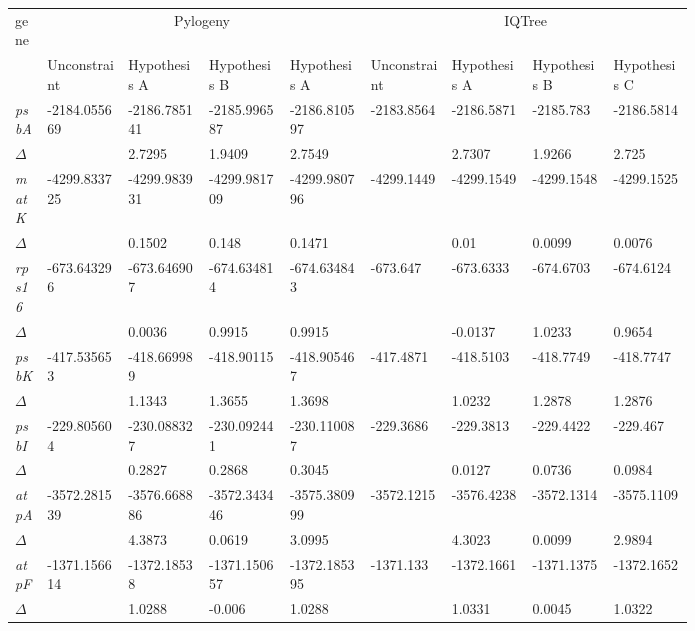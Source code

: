 \documentclass[a4paper]{article}
\begin{document}
\footnotesize
\begin{longtable}{p{0.03\linewidth}|p{0.095\linewidth}p{0.095\linewidth}p{0.095\linewidth}p{0.095\linewidth}|p{0.095\linewidth}p{0.095\linewidth}p{0.095\linewidth}p{0.095\linewidth}}
gene & \multicolumn{4}{c}{Pylogeny} & \multicolumn{4}{c}{IQTree}\\
 & Unconstraint & Hypothesis A & Hypothesis B & Hypothesis A & Unconstraint & Hypothesis A & Hypothesis B & Hypothesis C\\
\endhead
 \rowcolor{black!20} \textit{psbA} & -2184.055669 & -2186.785141 & -2185.996587 & -2186.810597 & -2183.8564 & -2186.5871 & -2185.783 & -2186.5814\\
 \rowcolor{black!20} $\Delta$ &  & 2.7295 & 1.9409 & 2.7549 &  & 2.7307 & 1.9266 & 2.725\\
\textit{matK} & -4299.833725 & -4299.983931 & -4299.981709 & -4299.980796 & -4299.1449 & -4299.1549 & -4299.1548 & -4299.1525\\
$\Delta$ &  & 0.1502 & 0.148 & 0.1471 &  & 0.01 & 0.0099 & 0.0076\\
 \rowcolor{black!20} \textit{rps16} & -673.643296 & -673.646907 & -674.634814 & -674.634843 & -673.647 & -673.6333 & -674.6703 & -674.6124\\
 \rowcolor{black!20} $\Delta$ &  & 0.0036 & 0.9915 & 0.9915 &  & -0.0137 & 1.0233 & 0.9654\\
\textit{psbK} & -417.535653 & -418.669989 & -418.90115 & -418.905467 & -417.4871 & -418.5103 & -418.7749 & -418.7747\\
$\Delta$ &  & 1.1343 & 1.3655 & 1.3698 &  & 1.0232 & 1.2878 & 1.2876\\
 \rowcolor{black!20} \textit{psbI} & -229.805604 & -230.088327 & -230.092441 & -230.110087 & -229.3686 & -229.3813 & -229.4422 & -229.467\\
 \rowcolor{black!20} $\Delta$ &  & 0.2827 & 0.2868 & 0.3045 &  & 0.0127 & 0.0736 & 0.0984\\
\textit{atpA} & -3572.281539 & -3576.668886 & -3572.343446 & -3575.380999 & -3572.1215 & -3576.4238 & -3572.1314 & -3575.1109\\
$\Delta$ &  & 4.3873 & 0.0619 & 3.0995 &  & 4.3023 & 0.0099 & 2.9894\\
 \rowcolor{black!20} \textit{atpF} & -1371.156614 & -1372.18538 & -1371.150657 & -1372.185395 & -1371.133 & -1372.1661 & -1371.1375 & -1372.1652\\
 \rowcolor{black!20} $\Delta$ &  & 1.0288 & -0.006 & 1.0288 &  & 1.0331 & 0.0045 & 1.0322\\

\end{longtable}
\end{document}
